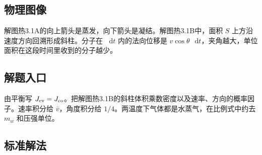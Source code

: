\documentclass[UTF8,fontset=fandol,a4paper,11pt]{ctexart}
\newcommand{\dd}{\mathop{}\!\mathrm{d}}
\begin{document}
\subsection*{物理图像}

解图热3.1A的向上箭头是蒸发，向下箭头是凝结。解图热3.1B中，面积 $S$ 上方沿速度方向回溯形成斜柱。分子在 $\dd t$ 内的法向位移是 $v\cos\theta\,\dd t$，夹角越大，单位面积在这段时间里收到的分子越少。



\subsection*{解题入口}

由平衡写 $J_{\rm ev}=J_{\rm co}$。把解图热3.1B的斜柱体积乘数密度以及速率、方向的概率因子。速率积分给 $\bar v$，角度积分给 $1/4$。两温度下气体都是水蒸气，在比例式中约去 $m_w$ 和压强单位。




\subsection*{标准解法}
\end{document}
